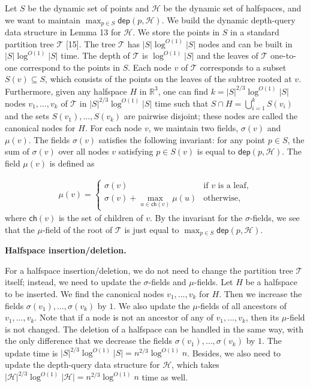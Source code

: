 Let $S$ be the dynamic set of points and $\mathcal{H}$ be the dynamic set of halfspaces, and we want to maintain $\max_{p\in S}\mathsf{dep}(p,\mathcal{H})$. We build the dynamic depth-query data structure in Lemma 13 for $\mathcal{H}$. We store the points in $S$ in a standard partition tree $\mathcal{T}$ [15]. The tree $\mathcal{T}$ has $|S|\log^{O(1)}|S|$ nodes and can be built in $|S|\log^{O(1)}|S|$ time. The depth of $\mathcal{T}$ is $\log^{O(1)}|S|$ and the leaves of $\mathcal{T}$ one-to-one correspond to the points in $S$. Each node $v$ of $\mathcal{T}$ corresponds to a subset $S(v)\subseteq S$, which consists of the points on the leaves of the subtree rooted at $v$. Furthermore, given any halfspace $H$ in $\mathbb{R}^{3}$, one can find $k=|S|^{2/3}\log^{O(1)}|S|$ nodes $v_{1},\dots,v_{k}$ of $\mathcal{T}$ in $|S|^{2/3}\log^{O(1)}|S|$ time such that $S\cap H=\bigcup_{i=1}^{k}S(v_{i})$ and the sets $S(v_{1}),\dots,S(v_{k})$ are pairwise disjoint; these nodes are called the canonical nodes for $H$. For each node $v$, we maintain two fields, $\sigma(v)$ and $\mu(v)$. The fields $\sigma(v)$ satisfies the following invariant: for any point $p\in S$, the sum of $\sigma(v)$ over all nodes $v$ satisfying $p\in S(v)$ is equal to ${\mathsf{dep}}(p,\mathcal{H})$. The field $\mu(v)$ is defined as
\par
\[\begin{aligned}
\displaystyle\mu(v)=\begin{cases}\sigma(v)&\text{if }v\text{ is a leaf},\\
\sigma(v)+\max_{u\in\mathsf{ch}(v)}\mu(u)&\text{otherwise,}\end{cases}
\end{aligned}\]
where $\mathsf{ch}(v)$ is the set of children of $v$. By the invariant for the $\sigma$-fields, we see that the $\mu$-field of the root of $\mathcal{T}$ is just equal to $\max_{p\in S}{\mathsf{dep}}(p,\mathcal{H})$.
\par
\par
\par\medskip\noindent\textbf{Halfspace insertion/deletion.}\par
For a halfspace insertion/deletion, we do not need to change the partition tree $\mathcal{T}$ itself; instead, we need to update the $\sigma$-fields and $\mu$-fields. Let $H$ be a halfspace to be inserted. We find the canonical nodes $v_{1},\dots,v_{k}$ for $H$. Then we increase the fields $\sigma(v_{1}),\dots,\sigma(v_{k})$ by $1$. We also update the $\mu$-fields of all ancestors of $v_{1},\dots,v_{k}$. Note that if a node is not an ancestor of any of $v_{1},\dots,v_{k}$, then its $\mu$-field is not changed. The deletion of a halfspace can be handled in the same way, with the only difference that we decrease the fields $\sigma(v_{1}),\dots,\sigma(v_{k})$ by $1$. The update time is $|S|^{2/3}\log^{O(1)}|S|=n^{2/3}\log^{O(1)}n$. Besides, we also need to update the depth-query data structure for $\mathcal{H}$, which takes $|\mathcal{H}|^{2/3}\log^{O(1)}|\mathcal{H}|=n^{2/3}\log^{O(1)}n$ time as well.
